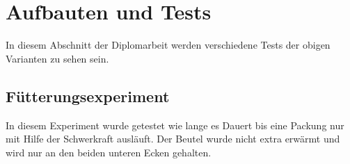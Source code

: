 \section{Aufbauten und Tests}

In diesem Abschnitt der Diplomarbeit werden verschiedene Tests der obigen Varianten zu sehen sein. \\

\subsection{Fütterungsexperiment} 

In diesem Experiment wurde getestet wie lange es Dauert bis eine Packung nur mit Hilfe der Schwerkraft ausläuft. Der Beutel wurde nicht extra erwärmt und wird nur an den beiden unteren Ecken gehalten.

